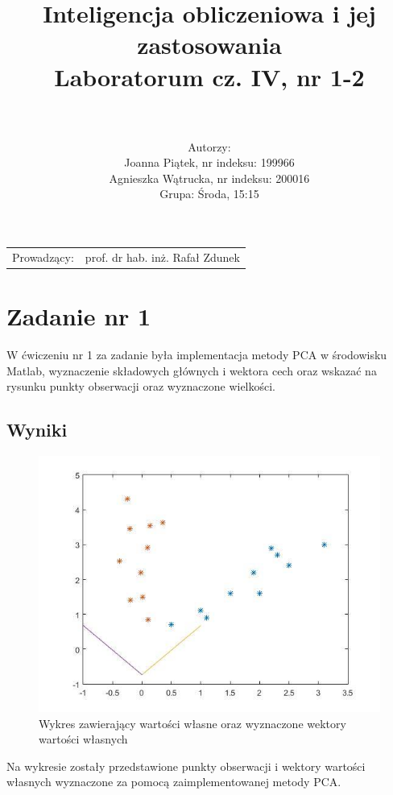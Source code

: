 \documentclass{article}
\title{Inteligencja obliczeniowa i jej zastosowania\\
	\vspace{5mm}
	\textbf{Laboratorum cz. IV, nr 1-2}} %
\author{\\
	\\Autorzy:
	\\Joanna Piątek, nr indeksu: 199966
	\\Agnieszka Wątrucka, nr indeksu: 200016
	\\Grupa: Środa, 15:15} %
\begin{document}
\maketitle %

\begin{center}
\begin{tabular}{l r}
Prowadzący: & prof. dr hab. inż. Rafał Zdunek %
\end{tabular}
\end{center}
 
\newpage
\newpage

\section{Zadanie nr 1}

\begin{center}


W ćwiczeniu nr 1 za zadanie była implementacja metody PCA w środowisku Matlab, wyznaczenie składowych głównych i wektora cech oraz wskazać na rysunku punkty obserwacji oraz wyznaczone wielkości.

\end{center}


\subsection{Wyniki}


\begin{figure}[H]
\centering

\includegraphics[scale=0.7]{IO_obrazy/Zad1}
\caption{Wykres zawierający wartości własne oraz wyznaczone wektory wartości własnych }
\end{figure}
Na wykresie zostały przedstawione punkty obserwacji i wektory wartości własnych wyznaczone za pomocą zaimplementowanej metody PCA.
\end{document}
